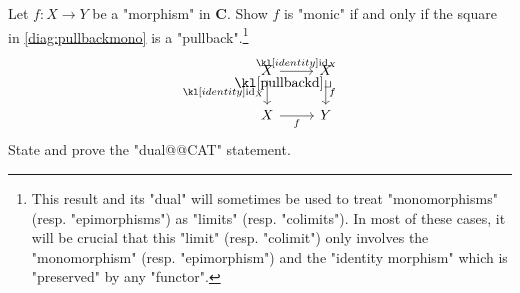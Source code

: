 \documentclass[main.tex]{subfiles}
\begin{document}
\begin{exer}\label{exer:limits:pullbackmono}
    Let $f: X \rightarrow Y$ be a "morphism" in $\mathbf{C}$. Show $f$ is "monic" if and only if the square in \eqref{diag:pullbackmono} is a "pullback".\footnote{This result and its "dual" will sometimes be used to treat "monomorphisms" (resp. "epimorphisms") as "limits" (resp. "colimits"). In most of these cases, it will be crucial that this "limit" (resp. "colimit") only involves the "monomorphism" (resp. "epimorphism") and the "identity morphism" which is "preserved" by any "functor".}
    \begin{equation}\label{diag:pullbackmono}
        \begin{tikzcd} %
            X & X \\
            X & Y
            \arrow["{\id_X}"', from=1-1, to=2-1]
            \arrow["f"', from=2-1, to=2-2]
            \arrow["{\id_X}", from=1-1, to=1-2]
            \arrow["f", from=1-2, to=2-2]
            \arrow["\pullbackd"{anchor=center, pos=0.125}, draw=none, from=1-1, to=2-2]
        \end{tikzcd}
    \end{equation}
    State and prove the "dual@@CAT" statement.
\end{exer}
\end{document}
